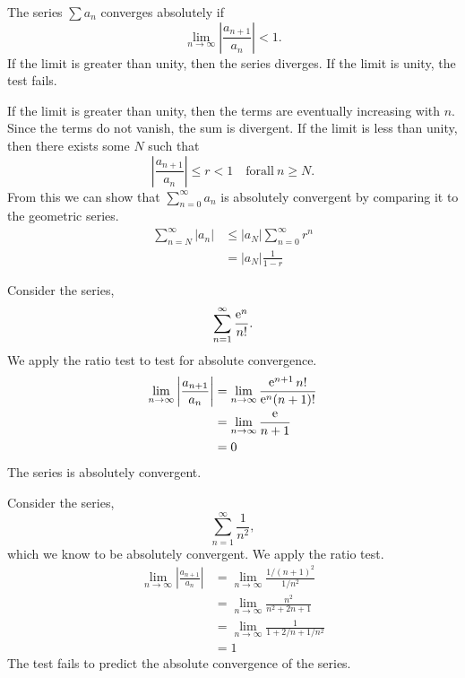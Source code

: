 \begin{Result}
  The series $\sum a_n$ converges absolutely if
  \[ 
  \lim_{n \to \infty} \left| \frac{a_{n+1}}{a_n} \right| < 1.
  \]
  If the limit is greater than unity, then the series diverges.  If the 
  limit is unity, the test fails.
\end{Result}


If the limit is greater than unity, then the terms are eventually increasing 
with $n$.  Since the terms do not vanish, the sum is divergent.
If the limit is less than unity, then there exists some $N$ such that 
\[ 
\left| \frac{a_{n+1}}{a_n} \right| \leq r < 1 \quad \mathrm{for all}\ n \geq N.
\]
From this we can show that $\sum_{n = 0}^\infty a_n$ is absolutely convergent by 
comparing it to the geometric series.
\begin{align*}
  \sum_{n=N}^\infty |a_n| &\leq |a_N| \sum_{n = 0}^\infty r^n 
  \\
  &= |a_N| \frac{1}{1 - r}
\end{align*}





\begin{Example}
  Consider the series,
  \[
  \sum_{n=1}^\infty \frac{\mathop{\mathrm{e}}\nolimits^n}{n!}.
  \]
  We apply the ratio test to test for absolute convergence.
  \begin{align*}
    \lim_{n \to \infty} \left| \frac{a_{n+1}}{a_n} \right|
    &= \lim_{n \to \infty} \frac{\mathop{\mathrm{e}}\nolimits^{n+1} n!}{\mathop{\mathrm{e}}\nolimits^n (n + 1)!} 
    \\
    &= \lim_{n \to \infty} \frac{\mathop{\mathrm{e}}\nolimits}{n + 1} 
    \\
    &= 0
  \end{align*}
  The series is absolutely convergent.
\end{Example}






\begin{Example}
  Consider the series,
  \[
  \sum_{n = 1}^\infty \frac{1}{n^2},
  \]
  which we know to be absolutely convergent.  We apply the ratio test.
  \begin{align*}
    \lim_{n \to \infty} \left| \frac{a_{n+1}}{a_n} \right|
    &= \lim_{n \to \infty} \frac{1/(n+1)^2}{1/n^2} 
    \\
    &= \lim_{n \to \infty} \frac{n^2}{n^2 + 2 n + 1} 
    \\
    &= \lim_{n \to \infty} \frac{1}{1 + 2 / n + 1 / n^2 } 
    \\
    &= 1
  \end{align*}
  The test fails to predict the absolute convergence of the series.
\end{Example}







